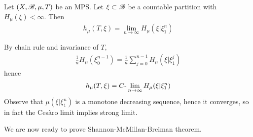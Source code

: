 \documentclass[10pt,a4paper]{report}
\newenvironment{proof}
{\begin{changemargin}{1cm}{0.5cm} 
	}%
	{\end{changemargin}
}
\begin{document}
\lem Let $(X,\mathscr{B}, \mu, T)$ be an MPS. Let $\xi \subset \mathscr{B}$ be a countable partition with $H_{\mu}(\xi)< \infty$. Then
\begin{align*}
h_{\mu}(T,\xi) = \lim_{n\rightarrow \infty} H_{\mu}(\xi | \xi_1^n)
\end{align*}
\begin{proof}
\pf By chain rule and invariance of $T$,
\begin{align*}
\frac{1}{n} H_{\mu}(\xi_0^{n-1}) = \frac{1}{n} \sum_{j=0}^{n-1} H_{\mu}(\xi | \xi_1^j)
\end{align*}
hence
\begin{align*}
h_{\mu}(T,\xi) = C\text{-}\lim_{n\rightarrow \infty} H_{\mu}(\xi | \xi_1^n)
\end{align*}
Observe that $\mu(\xi | \xi_1^n)$ is a monotone decreasing sequence, hence it converges, so in fact the Ces\`{a}ro limit implies strong limit.

\eop
\end{proof}
\s

We are now ready to prove Shannon-McMillan-Breiman theorem.
\s
\end{document}
